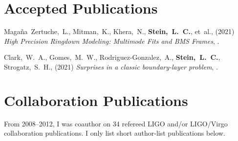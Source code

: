\section{\sc Accepted Publications}
\addtocounter{pubCounter}{-1}
\begin{etaremune}[start=\value{pubCounter}]
\item
  Magaña~Zertuche,~L.,
  Mitman,~K.,
  Khera,~N.,
  {\bf Stein,~L.~C.},
  et~al.,
  (2021)
  {\it High Precision Ringdown Modeling: Multimode Fits and BMS Frames},
  .
\item
  Clark,~W.~A.,
  Gomes,~M.~W.,
  Rodriguez-Gonzalez,~A.,
  {\bf Stein,~L.~C.},
  Strogatz,~S.~H.,
  (2021)
  {\it Surprises in a classic boundary-layer problem},
  .
  \setcounter{pubCounter}{\value{enumi}}
\end{etaremune}

\section{\sc Collaboration Publications}
From 2008--2012, I was coauthor on 34 refereed LIGO and/or LIGO/Virgo
collaboration publications. I only list short author-list publications below.

